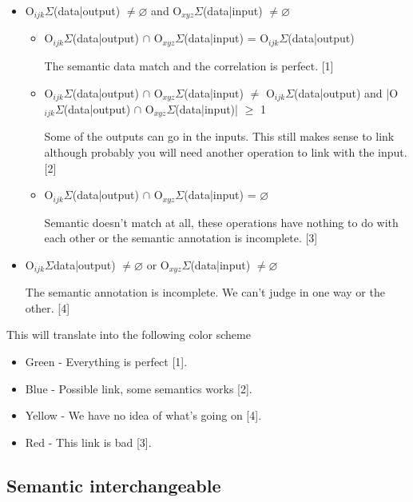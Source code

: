 \documentclass[a4paper,10pt]{article}
\begin{document}
\begin{itemize}
  \item O$_{ijk}\Sigma$(data|output) $\neq \varnothing$ and O$_{xyz}\Sigma$(data|input) $\neq \varnothing$

    \begin{itemize}

      \item O$_{ijk}\Sigma$(data|output) $\cap$ O$_{xyz}\Sigma$(data|input) = O$_{ijk}\Sigma$(data|output)

      The semantic data match and the correlation is perfect. [1]

      \item O$_{ijk}\Sigma$(data|output) $\cap$ O$_{xyz}\Sigma$(data|input) $\neq$ O$_{ijk}\Sigma$(data|output) and |O$_{ijk}\Sigma$(data|output) $\cap$ O$_{xyz}\Sigma$(data|input)| $\geq$ 1

      Some of the outputs can go in the inputs. This still makes sense to link although probably you will need another operation to link with the input. [2]

      \item O$_{ijk}\Sigma$(data|output) $\cap$ O$_{xyz}\Sigma$(data|input) = $\varnothing$

      Semantic doesn't match at all, these operations have nothing to do with each other or the semantic annotation is incomplete. [3]

    \end{itemize}

  \item O$_{ijk}\Sigma$data|output) $\neq \varnothing$ or O$_{xyz}\Sigma$(data|input) $\neq \varnothing$

  The semantic annotation is incomplete. We can't judge in one way or the other. [4]

\end{itemize}  

This will translate into the following color scheme

\begin{itemize}
  \item Green - Everything is perfect [1].
  \item Blue - Possible link, some semantics works [2].
  \item Yellow - We have no idea of what's going on [4].
  \item Red - This link is bad [3].
\end{itemize}

  \subsection{Semantic interchangeable}
\end{document}
